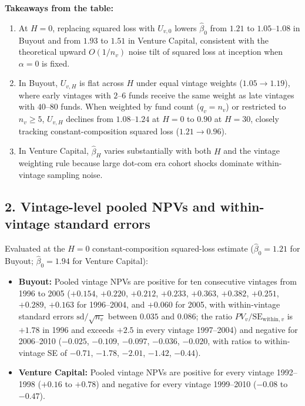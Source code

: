 \documentclass[11pt]{article}
\begin{document}
\textbf{Takeaways from the table:}
\begin{enumerate}
\item At $H=0$, replacing squared loss with $U_{v,0}$ lowers $\hat\beta_0$ from $1.21$ to $1.05$--$1.08$ in Buyout and from $1.93$ to $1.51$ in Venture Capital, consistent with the theoretical upward $O(1/n_v)$ noise tilt of squared loss at inception when $\alpha=0$ is fixed.
\item In Buyout, $U_{v,H}$ is flat across $H$ under equal vintage weights ($1.05\to 1.19$), where early vintages with $2$--$6$ funds receive the same weight as late vintages with $40$--$80$ funds. When weighted by fund count ($q_v=n_v$) or restricted to $n_v\ge 5$, $U_{v,H}$ declines from $1.08$--$1.24$ at $H=0$ to $0.90$ at $H=30$, closely tracking constant-composition squared loss ($1.21\to 0.96$).
\item In Venture Capital, $\hat\beta_H$ varies substantially with both $H$ and the vintage weighting rule because large dot-com era cohort shocks dominate within-vintage sampling noise.
\end{enumerate}

\subsection*{2. Vintage-level pooled NPVs and within-vintage standard errors}

Evaluated at the $H=0$ constant-composition squared-loss estimate ($\hat\beta_0=1.21$ for Buyout; $\hat\beta_0=1.94$ for Venture Capital):
\begin{itemize}
\item \textbf{Buyout:} Pooled vintage NPVs are positive for ten consecutive vintages from 1996 to 2005 ($+0.154$, $+0.220$, $+0.212$, $+0.233$, $+0.363$, $+0.382$, $+0.251$, $+0.289$, $+0.163$ for 1996--2004, and $+0.060$ for 2005, with within-vintage standard errors $\mathrm{sd}/\sqrt{n_v}$ between $0.035$ and $0.086$; the ratio $PV_v/\mathrm{SE}_{\text{within},v}$ is $+1.78$ in 1996 and exceeds $+2.5$ in every vintage 1997--2004) and negative for 2006--2010 ($-0.025$, $-0.109$, $-0.097$, $-0.036$, $-0.020$, with ratios to within-vintage SE of $-0.71$, $-1.78$, $-2.01$, $-1.42$, $-0.44$).
\item \textbf{Venture Capital:} Pooled vintage NPVs are positive for every vintage 1992--1998 ($+0.16$ to $+0.78$) and negative for every vintage 1999--2010 ($-0.08$ to $-0.47$).
\end{itemize}
\end{document}
